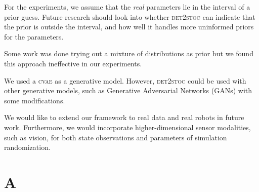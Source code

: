 \documentclass{kththesis}
\newcommand{\cvae}{\textsc{cvae}}
\newcommand{\dettostoc}{\textsc{det2stoc}}
\begin{document}
For the experiments, we assume that the \textit{real} parameters lie in the interval of a prior guess. Future research should look into whether \dettostoc{} can indicate that the prior is outside the interval, and how well it handles more uninformed priors for the parameters.

Some work was done trying out a mixture of distributions as prior \parencite{DBLP:journals/corr/DilokthanakulMG16} but we found this approach ineffective in our experiments. 

We used a \cvae{} as a generative model. However, \dettostoc{} could be used with other generative models, such as Generative Adversarial Networks (GANs) \parencite{goodfellow2014} with some modifications.

We would like to extend our framework to real data and real robots in future work. Furthermore, we would incorporate higher-dimensional sensor modalities, such as vision, for both state observations and parameters of simulation randomization.

\printbibliography[heading=bibintoc]

\appendix

\chapter{A}
\label{appendix:a}
\end{document}
